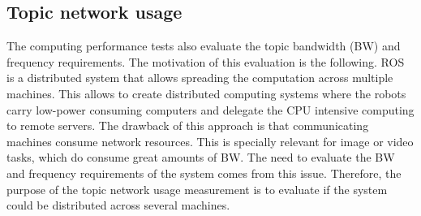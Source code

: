


		\subsection{Topic network usage}

		The computing performance tests also evaluate the topic bandwidth (BW) and frequency requirements. 
		The motivation of this evaluation is the following.
		ROS is a distributed system that allows spreading the computation across multiple machines. 
		This allows to create distributed computing systems where the robots carry low-power consuming computers and delegate the CPU intensive computing to remote servers.	
		The drawback of this approach is that communicating machines consume network resources. 
		This is specially relevant for image or video tasks, which do consume great amounts of BW. 
		The need to evaluate the BW and frequency requirements of the system comes from this issue. 
		Therefore, the purpose of the topic network usage measurement is to evaluate if the system could be distributed across several machines.

	

